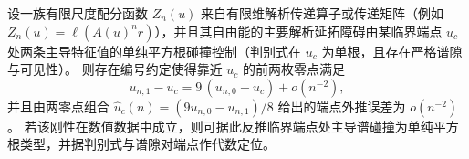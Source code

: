 \begin{conjecture}[平方根端点下的两零点比值刚性与超收敛外推]\label{conj:xi-leyang-square-root-endpoint-two-zero-ratio}
设一族有限尺度配分函数 \(Z_n(u)\) 来自有限维解析传递算子或传递矩阵（例如 \(Z_n(u)=\ell(A(u)^n r)\)），并且其自由能的主要解析延拓障碍由某临界端点 \(u_c\) 处两条主导特征值的单纯平方根碰撞控制（判别式在 \(u_c\) 为单根，且存在严格谱隙与可见性）。
则存在编号约定使得靠近 \(u_c\) 的前两枚零点满足
\[
u_{n,1}-u_c=9\,(u_{n,0}-u_c)+o(n^{-2}),
\]
并且由两零点组合
\(
\widehat u_c(n)=(9u_{n,0}-u_{n,1})/8
\)
给出的端点外推误差为 \(o(n^{-2})\)。
若该刚性在数值数据中成立，则可据此反推临界端点处主导谱碰撞为单纯平方根类型，并据判别式与谱隙对端点作代数定位。
\end{conjecture}
